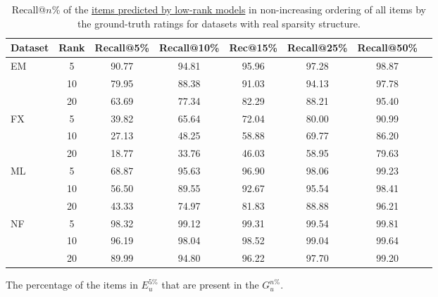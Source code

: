 \begin{table}[bt]
  \centering
  \begin{threeparttable}
    \caption{Recall@$n$\%\tnote{\textasteriskcentered} of the \topf \underline{items predicted by low-rank
    models} in non-increasing ordering of all items by the ground-truth ratings for datasets with real sparsity structure.} 
  \label{table:mftop_table}
  \setlength{\tabcolsep}{.25em}
  \begin{tabular}{lcc*{5}{c}}
    \hline
    Dataset
    &\multicolumn{1}{p{1cm}}{\centering Rank}
    & Recall@5\% & Recall@10\% & Rec@15\% & Recall@25\% & Recall@50\% \\
    \hline
    \multirow{3}{*}{EM}  & \multirow{1}{*}{5} &  90.77 & 94.81 & 95.96 & 97.28 & 98.87\\
                         & \multirow{1}{*}{10} &  79.95 & 88.38 & 91.03 & 94.13 & 97.78\\ 
                         & \multirow{1}{*}{20} &  63.69 & 77.34 & 82.29 & 88.21 & 95.40\\ 
    \hline
    \multirow{3}{*}{FX}  & \multirow{1}{*}{5} & 39.82 & 65.64 & 72.04 & 80.00 & 90.99\\
                         & \multirow{1}{*}{10} & 27.13 & 48.25 & 58.88 & 69.77 & 86.20\\ 
                         & \multirow{1}{*}{20} & 18.77 & 33.76 & 46.03 & 58.95 & 79.63\\ 
    \hline
    \multirow{3}{*}{ML}  & \multirow{1}{*}{5} &  68.87 & 95.63 & 96.90 & 98.06 & 99.23\\
                         & \multirow{1}{*}{10} &  56.50 & 89.55 & 92.67 & 95.54 & 98.41 \\ 
                         & \multirow{1}{*}{20} &  43.33 & 74.97 & 81.83 & 88.88 & 96.21\\ 
    \hline
    \multirow{3}{*}{NF}  & \multirow{1}{*}{5} &  98.32 & 99.12 & 99.31 & 99.54 & 99.81\\
                         & \multirow{1}{*}{10} &  96.19 & 98.04 & 98.52 & 99.04 & 99.64\\ 
                         & \multirow{1}{*}{20} &  89.99 & 94.80 & 96.22 & 97.70 & 99.20\\ 
    \hline
  \end{tabular}
  \begin{tablenotes}
  \item[\textasteriskcentered]The percentage of the items in $E_{u}^{5\%}$ that are present in the $G_{u}^{n\%}$. 
  \end{tablenotes}
\end{threeparttable}
\end{table}

